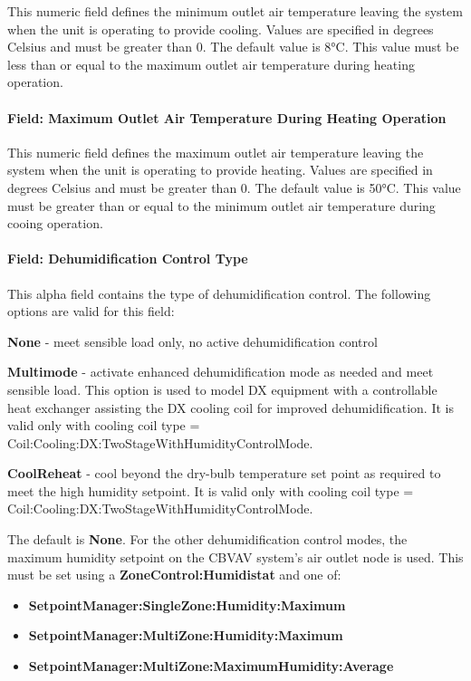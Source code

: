 This numeric field defines the minimum outlet air temperature leaving the system when the unit is operating to provide cooling. Values are specified in degrees Celsius and must be greater than 0. The default value is 8°C. This value must be less than or equal to the maximum outlet air temperature during heating operation.

\paragraph{Field: Maximum Outlet Air Temperature During Heating Operation}\label{field-maximum-outlet-air-temperature-during-heating-operation}

This numeric field defines the maximum outlet air temperature leaving the system when the unit is operating to provide heating. Values are specified in degrees Celsius and must be greater than 0. The default value is 50°C. This value must be greater than or equal to the minimum outlet air temperature during cooing operation.

\paragraph{Field: Dehumidification Control Type}\label{field-dehumidification-control-type-5-000}

This alpha field contains the type of dehumidification control. The following options are valid for this field:

\textbf{None} - meet sensible load only, no active dehumidification control

\textbf{Multimode} - activate enhanced dehumidification mode as needed and meet sensible load. This option is used to model DX equipment with a controllable heat exchanger assisting the DX cooling coil for improved dehumidification. It is valid only with cooling coil type = Coil:Cooling:DX:TwoStageWithHumidityControlMode.

\textbf{CoolReheat} - cool beyond the dry-bulb temperature set point as required to meet the high humidity setpoint. It is valid only with cooling coil type = Coil:Cooling:DX:TwoStageWithHumidityControlMode.

The default is \textbf{None}. For the other dehumidification control modes, the maximum humidity setpoint on the CBVAV system's air outlet node is used. This must be set using a \textbf{ZoneControl:Humidistat} and one of:

\begin{itemize}
\item
  \textbf{SetpointManager:SingleZone:Humidity:Maximum}
\item
  \textbf{SetpointManager:MultiZone:Humidity:Maximum}
\item
  \textbf{SetpointManager:MultiZone:MaximumHumidity:Average}
\end{itemize}

